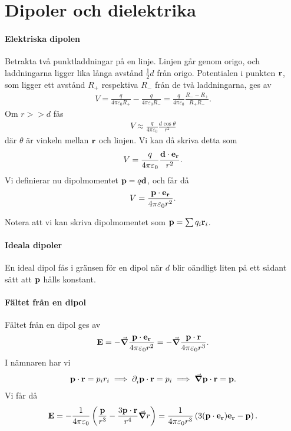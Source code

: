 \section{Dipoler och dielektrika}

\paragraph{Elektriska dipolen}
Betrakta två punktladdningar på en linje. Linjen går genom origo, och laddningarna ligger lika långa avstånd $\frac{1}{2}d$ från origo. Potentialen i punkten $\vb{r}$, som ligger ett avstånd $R_{+}$ respektiva $R_{-}$ från de två laddningarna, ges av
\begin{align*}
	V = \frac{q}{4\pi\varepsilon_{0}R_{+}} - \frac{q}{4\pi\varepsilon_{0}R_{-}} = \frac{q}{4\pi\varepsilon_{0}}\frac{R_{-} - R_{+}}{R_{+}R_{-}}.
\end{align*}
Om $r >> d$ fås
\begin{align*}
	V \approx \frac{q}{4\pi\varepsilon_{0}}\frac{d\cos{\theta}}{r^{2}}
\end{align*}
där $\theta$ är vinkeln mellan $\vb{r}$ och linjen. Vi kan då skriva detta som
\begin{align*}
	V = \frac{q}{4\pi\varepsilon_{0}}\frac{\vb{d}\cdot\vb{e}_{\vb{r}}}{r^{2}}.
\end{align*}
Vi definierar nu dipolmomentet $\vb{p} = q\vb{d}$, och får då
\begin{align*}
	V = \frac{\vb{p}\cdot\vb{e}_{\vb{r}}}{4\pi\varepsilon_{0}r^{2}}.
\end{align*}

Notera att vi kan skriva dipolmomentet som $\vb{p} = \sum q_{i}\vb{r}_{i}$.

\paragraph{Ideala dipoler}
En ideal dipol fås i gränsen för en dipol när $d$ blir oändligt liten på ett sådant sätt att $\vb{p}$ hålls konstant.

\paragraph{Fältet från en dipol}
Fältet från en dipol ges av
\begin{align*}
	\vb{E} = -\grad{\frac{\vb{p}\cdot\vb{e}_{\vb{r}}}{4\pi\varepsilon_{0}r^{2}}} = -\grad{\frac{\vb{p}\cdot\vb{r}}{4\pi\varepsilon_{0}r^{3}}}.
\end{align*}
I nämnaren har vi
\begin{align*}
	\vb{p}\cdot\vb{r} = p_{i}r_{i} \implies \partial_{i}^{}\vb{p}\cdot\vb{r} = p_{i} \implies \grad{\vb{p}\cdot\vb{r}} = \vb{p}.
\end{align*}
Vi får då
\begin{align*}
	\vb{E} = -\frac{1}{4\pi\varepsilon_{0}}\left(\frac{\vb{p}}{r^{3}} - \frac{3\vb{p}\cdot\vb{r}}{r^{4}}\grad{r}\right) = \frac{1}{4\pi\varepsilon_{0}r^{3}}\left(3(\vb{p}\cdot\vb{e}_{\vb{r}})\vb{e}_{\vb{r}} - \vb{p}\right).
\end{align*}

